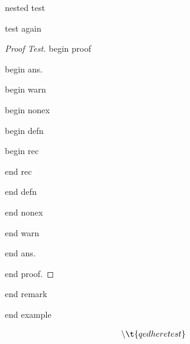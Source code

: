 \documentclass{article}
\numberwithin{thm}{section}
\numberwithin{prob}{section}
\numberwithin{equation}{section}
\begin{document}
\begin{ex}
    nested test
    \begin{rem}[stuff]
        test again
        \begin{proof}[Proof Test]
            begin proof
            \begin{ans}[Parenthetical]
                begin ans.
                \begin{warn}
                    begin warn
                    \begin{nonex}
                        begin nonex
                        \begin{defn}
                            begin defn
                            \begin{rec}
                                begin rec
                                
                                end rec
                            \end{rec}
                            end defn
                        \end{defn}
                        end nonex
                    \end{nonex}
                    end warn
                \end{warn}
                end ans.
            \end{ans}
            end proof.
        \end{proof}
        end remark
    \end{rem}
    end example
\end{ex}
\begin{ex}
    \begin{align*}
        \bs\t{qedhere test} &\qedhere
    \end{align*}
\end{ex}
\end{document}
